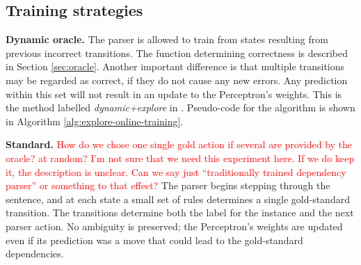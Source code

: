 \documentclass[11pt,letterpaper]{article}
\newcommand{\note}[1]{\textcolor{red}{#1}}
\begin{document}
\subsection{Training strategies}

\textbf{Dynamic oracle.} The parser is allowed to train from states
resulting from previous incorrect transitions. The function determining correctness
is described in Section \ref{sec:oracle}. Another important difference is that
multiple transitions may be regarded as correct, if they do not cause any new
errors. Any prediction within this set will not result in an update to the
Perceptron's weights. This is the method labelled \emph{dynamic+explore}
in \citet{goldberg:12}. Pseudo-code for the algorithm is shown in Algorithm
\ref{alg:explore-online-training}.

\textbf{Standard.}
\note{How do we chose one single gold action if several are provided by the oracle? at random? I'm not sure that we need this experiment here. If we do keep it, the description is unclear. Can we say just ``traditionally trained dependency parser'' or something to that effect?}
The parser begins stepping through the sentence, and at each state a small
set of rules determines a single gold-standard transition. The transitions
determine both the label for the instance and the next parser action. No ambiguity
is preserved; the Perceptron's weights are updated even if its prediction was a move
that could lead to the gold-standard dependencies.
\end{document}
